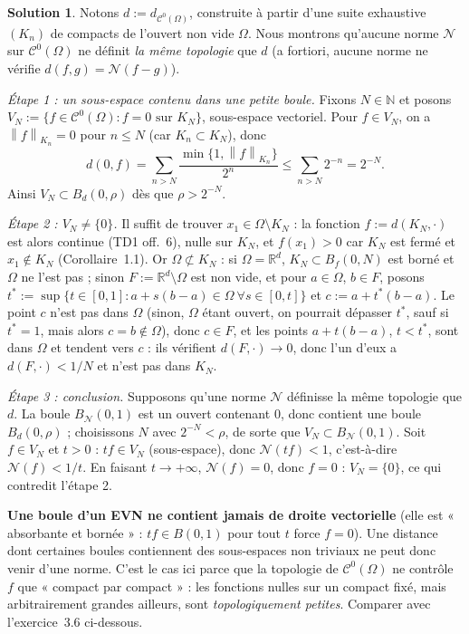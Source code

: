 \documentclass[11pt,a4paper]{article}
\newcommand{\R}{\mathbb{R}}
\newcommand{\N}{\mathbb{N}}
\newcommand{\Bf}{B_f}
\newcommand{\norm}[1]{\left\|#1\right\|}
\newcommand{\Cz}{\mathcal{C}^0}
\newcommand{\ie}{c'est-à-dire}
\theoremstyle{definition}
\newtheorem*{solution}{Solution}
\begin{document}
\begin{solution}
Notons $d:=d_{\Cz(\Omega)}$, construite à partir d'une suite exhaustive $(K_n)$ de compacts de l'ouvert non vide $\Omega$. Nous montrons qu'aucune norme $\mathcal N$ sur $\Cz(\Omega)$ ne définit \emph{la même topologie} que $d$ (a fortiori, aucune norme ne vérifie $d(f,g)=\mathcal N(f-g)$).

\emph{Étape 1 : un sous-espace contenu dans une petite boule.} Fixons $N\in\N$ et posons $V_N:=\{f\in\Cz(\Omega) : f=0\text{ sur }K_N\}$, sous-espace vectoriel. Pour $f\in V_N$, on a $\norm f_{K_n}=0$ pour $n\le N$ (car $K_n\subset K_N$), donc
\[
d(0,f)=\sum_{n>N}\frac{\min\{1,\norm f_{K_n}\}}{2^n}\le\sum_{n>N}2^{-n}=2^{-N}.
\]
Ainsi $V_N\subset B_d(0,\rho)$ dès que $\rho>2^{-N}$.

\emph{Étape 2 : $V_N\ne\{0\}$.} Il suffit de trouver $x_1\in\Omega\setminus K_N$ : la fonction $f:=d(K_N,\cdot)$ est alors continue (TD1 off.~6), nulle sur $K_N$, et $f(x_1)>0$ car $K_N$ est fermé et $x_1\notin K_N$ (Corollaire~1.1). Or $\Omega\not\subset K_N$ : si $\Omega=\R^d$, $K_N\subset\Bf(0,N)$ est borné et $\Omega$ ne l'est pas ; sinon $F:=\R^d\setminus\Omega$ est non vide, et pour $a\in\Omega$, $b\in F$, posons $t^*:=\sup\{t\in[0,1] : a+s(b-a)\in\Omega\ \forall s\in[0,t]\}$ et $c:=a+t^*(b-a)$. Le point $c$ n'est pas dans $\Omega$ (sinon, $\Omega$ étant ouvert, on pourrait dépasser $t^*$, sauf si $t^*=1$, mais alors $c=b\notin\Omega$), donc $c\in F$, et les points $a+t(b-a)$, $t<t^*$, sont dans $\Omega$ et tendent vers $c$ : ils vérifient $d(F,\cdot)\to0$, donc l'un d'eux a $d(F,\cdot)<1/N$ et n'est pas dans $K_N$.

\emph{Étape 3 : conclusion.} Supposons qu'une norme $\mathcal N$ définisse la même topologie que $d$. La boule $B_{\mathcal N}(0,1)$ est un ouvert contenant $0$, donc contient une boule $B_d(0,\rho)$ ; choisissons $N$ avec $2^{-N}<\rho$, de sorte que $V_N\subset B_{\mathcal N}(0,1)$. Soit $f\in V_N$ et $t>0$ : $tf\in V_N$ (sous-espace), donc $\mathcal N(tf)<1$, \ie{} $\mathcal N(f)<1/t$. En faisant $t\to+\infty$, $\mathcal N(f)=0$, donc $f=0$ : $V_N=\{0\}$, ce qui contredit l'étape 2.
\end{solution}

\begin{pointcle}
\textbf{Une boule d'un EVN ne contient jamais de droite vectorielle} (elle est « absorbante et bornée » : $tf\in B(0,1)$ pour tout $t$ force $f=0$). Une distance dont certaines boules contiennent des sous-espaces non triviaux ne peut donc venir d'une norme. C'est le cas ici parce que la topologie de $\Cz(\Omega)$ ne contrôle $f$ que « compact par compact » : les fonctions nulles sur un compact fixé, mais arbitrairement grandes ailleurs, sont \emph{topologiquement petites}. Comparer avec l'exercice~3.6 ci-dessous.
\end{pointcle}
\end{document}
